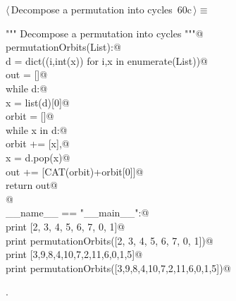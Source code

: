 \documentclass[11pt,oneside]{article}	%
\begin{document}
\begin{flushleft} \small \label{scrap117}
\protect{}$\langle\,$Decompose a permutation into cycles\nobreak\ {\footnotesize 60c}$\,\rangle\equiv$
\vspace{-1ex}
\begin{list}{}{} \item
\mbox{}\verb@""" Decompose a permutation into cycles """@\\
\mbox{}\verb@def permutationOrbits(List):@\\
\mbox{}\verb@   d = dict((i,int(x)) for i,x in enumerate(List))@\\
\mbox{}\verb@   out = []@\\
\mbox{}\verb@   while d:@\\
\mbox{}\verb@      x = list(d)[0]@\\
\mbox{}\verb@      orbit = []@\\
\mbox{}\verb@      while x in d:@\\
\mbox{}\verb@         orbit += [x],@\\
\mbox{}\verb@         x = d.pop(x)@\\
\mbox{}\verb@      out += [CAT(orbit)+orbit[0]]@\\
\mbox{}\verb@   return out@\\
\mbox{}\verb@      @\\
\mbox{}\verb@if __name__ == "__main__":@\\
\mbox{}\verb@   print [2, 3, 4, 5, 6, 7, 0, 1]@\\
\mbox{}\verb@   print permutationOrbits([2, 3, 4, 5, 6, 7, 0, 1])@\\
\mbox{}\verb@   print [3,9,8,4,10,7,2,11,6,0,1,5]@\\
\mbox{}\verb@   print permutationOrbits([3,9,8,4,10,7,2,11,6,0,1,5])@\\
\mbox{}\verb@@{\NWsep}
\end{list}
\vspace{-1ex}
\footnotesize\addtolength{\baselineskip}{-1ex}
\begin{list}{}{\setlength{\itemsep}{-\parsep}\setlength{\itemindent}{-\leftmargin}}
\item {\NWtxtMacroNoRef}.
\end{list}
\end{flushleft}
\end{document}
